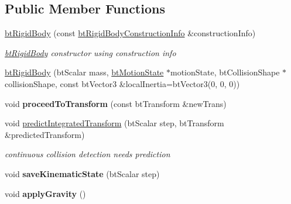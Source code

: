 \subsection*{Public Member Functions}
\begin{DoxyCompactItemize}
\item 
\mbox{\label{classbtRigidBody_a66a55c268281f64e849851a929449ffd}} 
\hyperlink{classbtRigidBody_a66a55c268281f64e849851a929449ffd}{bt\+Rigid\+Body} (const \hyperlink{structbtRigidBody_1_1btRigidBodyConstructionInfo}{bt\+Rigid\+Body\+Construction\+Info} \&construction\+Info)
\begin{DoxyCompactList}\small\item\em \hyperlink{classbtRigidBody}{bt\+Rigid\+Body} constructor using construction info \end{DoxyCompactList}\item 
\hyperlink{classbtRigidBody_aac9b7d050bc87644d38e9ffe4fe4c5ab}{bt\+Rigid\+Body} (bt\+Scalar mass, \hyperlink{classbtMotionState}{bt\+Motion\+State} $\ast$motion\+State, bt\+Collision\+Shape $\ast$collision\+Shape, const bt\+Vector3 \&local\+Inertia=bt\+Vector3(0, 0, 0))
\item 
\mbox{\label{classbtRigidBody_a70f38cd1bb359db4992a374da778bac7}} 
void {\bfseries proceed\+To\+Transform} (const bt\+Transform \&new\+Trans)
\item 
\mbox{\label{classbtRigidBody_af7f9b40d0abcfe9927d2e9c011947cec}} 
void \hyperlink{classbtRigidBody_af7f9b40d0abcfe9927d2e9c011947cec}{predict\+Integrated\+Transform} (bt\+Scalar step, bt\+Transform \&predicted\+Transform)
\begin{DoxyCompactList}\small\item\em continuous collision detection needs prediction \end{DoxyCompactList}\item 
\mbox{\label{classbtRigidBody_a77b69b89ec3dfcd502e122cfaafdf4f6}} 
void {\bfseries save\+Kinematic\+State} (bt\+Scalar step)
\item 
\mbox{\label{classbtRigidBody_a08f1a05a572e7ff53f3874bda43c75b9}} 
void {\bfseries apply\+Gravity} ()
\item 
\mbox{\label{classbtRigidBody_a5aedec73517fb7b9cddcbd72663e0ddc}} 

\end{DoxyCompactItemize}
